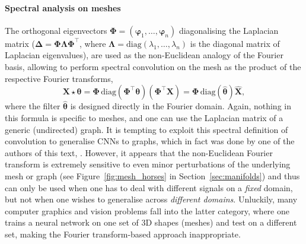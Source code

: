 \paragraph{Spectral analysis on meshes}
%
The orthogonal eigenvectors $\boldsymbol{\Phi} = (\boldsymbol{\varphi}_1, \hdots, \boldsymbol{\varphi}_n)$ diagonalising the  Laplacian matrix ($\boldsymbol{\Delta} = \boldsymbol{\Phi} \boldsymbol{\Lambda} \boldsymbol{\Phi}^\top$, where $\boldsymbol{\Lambda} = \mathrm{diag}(\lambda_1, \hdots, \lambda_n)$ is the diagonal matrix of Laplacian eigenvalues), are used as the non-Euclidean analogy of the Fourier basis, allowing to perform spectral convolution on the mesh as the product of the respective Fourier transforms, 
$$
\mathbf{X} \star \boldsymbol{\theta} = 
\boldsymbol{\Phi} \, \mathrm{diag}(\boldsymbol{\Phi}^\top \boldsymbol{\theta}) (\boldsymbol{\Phi}^\top \mathbf{X}) 
=
\boldsymbol{\Phi}\, \mathrm{diag}(\hat{\boldsymbol{\theta}}) \hat{\mathbf{X}},
$$
%
where the filter $\hat{\boldsymbol{\theta}}$ is designed directly in the Fourier domain.  
%
Again, nothing in this formula is specific to meshes, and one can use the Laplacian matrix of a generic (undirected) graph.
%
%
It is tempting to exploit this spectral definition of convolution to generalise CNNs to graphs, which in fact was done by one of the authors of this text, \cite{bruna2013spectral}. 
%
However, it appears that the non-Euclidean Fourier transform 
is extremely sensitive to even minor perturbations of the underlying mesh or graph (see Figure~\ref{fig:mesh_horses} in Section~\ref{sec:manifolds}) and thus can only be used when one has to deal with different signals on a {\em fixed} domain, but not when one wishes to generalise across {\em different domains}. 
%
Unluckily, many computer graphics and vision problems fall into the latter category, where one trains a neural network on one set of 3D shapes (meshes) and test on a different set, making the Fourier transform-based approach inappropriate.  




